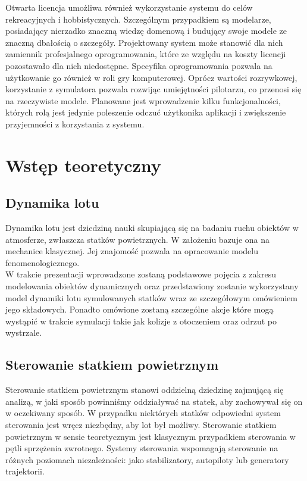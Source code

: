 \documentclass[15pt]{sprawozdanie}
\begin{document}
Otwarta licencja umożliwa również wykorzystanie systemu do celów rekreacyjnych i hobbistycznych. Szczególnym przypadkiem są modelarze, posiadający nierzadko znaczną wiedzę domenową i budujący swoje modele ze znaczną dbałością o szczegóły. Projektowany system może stanowić dla nich zamiennik profesjalnego oprogramowania, które ze względu na koszty licencji pozostawało dla nich niedostępne. Specyfika oprogramowania pozwala na użytkowanie go również w roli gry komputerowej. Oprócz wartości rozrywkowej, korzystanie z symulatora pozwala rozwijąc umiejętności pilotarzu, co przenosi się na rzeczywiste modele. Planowane jest wprowadzenie kilku funkcjonalności, których rolą jest jedynie poleszenie odczuć użytkonika aplikacji i zwiększenie przyjemności z korzystania z systemu.

\newpage

\section{Wstęp teoretyczny}


\subsection{Dynamika lotu}

Dynamika lotu jest dziedziną nauki skupiającą się na badaniu ruchu obiektów w atmosferze, zwłaszcza statków powietrznych. W założeniu bazuje ona na mechanice klasycznej. Jej znajomość pozwala na opracowanie modelu fenomenologicznego. \\

W trakcie prezentacji wprowadzone zostaną podstawowe pojęcia z zakresu modelowania obiektów dynamicznych oraz przedstawiony zostanie wykorzystany model dynamiki lotu symulowanych statków wraz ze szczegółowym omówieniem jego składowych. Ponadto omówione zostaną szczególne akcje które mogą wystąpić w trakcie symulacji takie jak kolizje z otoczeniem oraz odrzut po wystrzale.

\subsection{Sterowanie statkiem powietrznym}

Sterowanie statkiem powietrznym stanowi oddzielną dziedzinę zajmującą się analizą, w jaki sposób powinniśmy oddziaływać na statek, aby zachowywał się on w oczekiwany sposób. W przypadku niektórych statków odpowiedni system sterowania jest wręcz niezbędny, aby lot był możliwy. Sterowanie statkiem powietrznym w sensie teoretycznym jest klasycznym przypadkiem sterowania w pętli sprzężenia zwrotnego. Systemy sterowania wspomagają sterowanie na różnych poziomach niezależności: jako stabilizatory, autopiloty lub generatory trajektorii. \\
\end{document}
